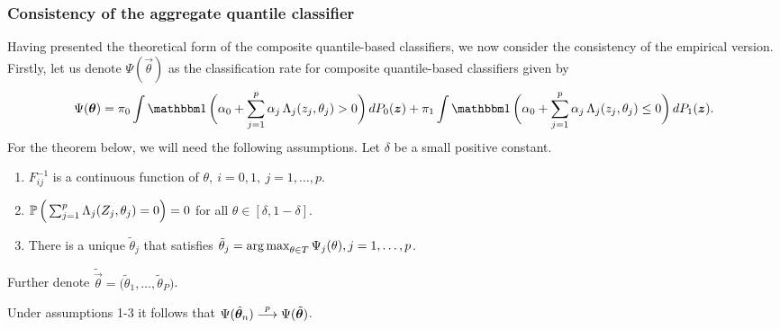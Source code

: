 \subsubsection{Consistency of the aggregate quantile classifier}
\label{sec:aggregate-classifier-consistency}

Having presented the theoretical form of the composite quantile-based
classifiers, we now consider the consistency of the empirical version.  Firstly,
let us denote $\Psi(\vec{\theta})$ as the classification rate for composite
quantile-based classifiers given by
\begin{equation}
  \label{eq:multivariate-theoretical-rate}
  \Psi(\vec{\theta}) =
  \pi_0 \int \ind\bigg(
  \alpha_0 + \sum_{j=1}^p \alpha_j \, \Lambda_j (z_j, \theta_j) > 0
  \bigg)\, dP_0(\vec{z}) +
  \pi_1 \int \ind\bigg(
  \alpha_0 + \sum_{j=1}^p \alpha_j \, \Lambda_j (z_j, \theta_j) \leq 0
  \bigg)\, dP_1(\vec{z}).
\end{equation}
For the theorem below, we will need the following assumptions.  Let $\delta$ be
a small positive constant.
\begin{enumerate}[label=\emph{Assumption \arabic*.}, align=left]
\item $F_{ij}^{-1}$ is a continuous function of
  $\theta,~ i=0,1,~ j=1, \dots, p$.
\item $\mathbb{P}\,\Big(
  \sum_{j=1}^p \Lambda_j (Z_j, \theta_j) = 0
  \Big) = 0$ for all
  $\theta \in [\delta, 1 - \delta]$.
\item There is a unique $\tilde{\theta}_j$ that satisfies
  $\tilde{\theta}_j = \operatorname*{arg\,max}_{\theta \in T} \Psi_j(\theta), j = 1, \dots, p$.
\end{enumerate}
Further denote
$\tilde{\vec{\theta}} = \Big( \tilde{\theta}_1, \dots, \tilde{\theta}_P \Big)$.
\vspace{5mm}

\begin{theorem}
  \label{thm:multivariate-consistency}
  Under assumptions 1-3 it follows that
  $\Psi(\hat{\bm{\theta}}_n) \stackrel{p}{\longrightarrow} \Psi(\tilde{\bm{\theta}})$.
\end{theorem}

